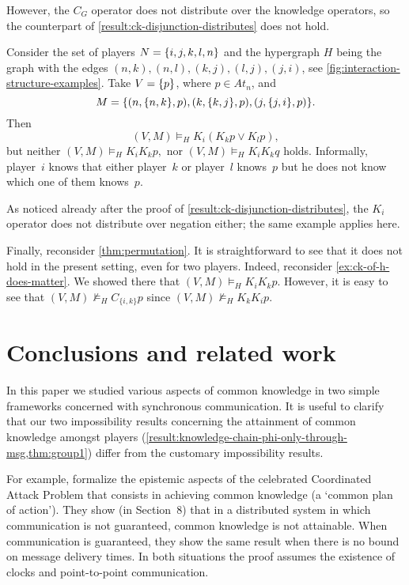 \documentclass{article}
\newcounter{#1}
\newcommand{\state}[1][]{\ensuremath{(V#1,M#1)}\xspace}
\newcommand{\bits}{\ensuremath{At}\xspace}
\newcommand{\knows}[1]{\ensuremath{K_{#1}}\xspace}
\newcommand{\ck}[1]{\ensuremath{C_{#1}}\xspace}\newcommand{\Facts}{\mathit{Facts}}
\renewcommand{\enspace}{}
\begin{document}
However, the $\ck G$ operator does not distribute over the knowledge operators,
so the counterpart of \cref{result:ck-disjunction-distributes} does not hold.

\begin{example}
  \label{ex:ck-doesnt-distribute-over-k}
  Consider the set of players $N = \mbox{$\{{i,j,k,l,n}\}$}$
  and the hypergraph $H$ being the graph with the edges
  $(n,k), (n,l), (k,j), (l,j), (j,i)$,
  see \cref{fig:interaction-structure-examples}.
  Take $V = \mbox{$\{{p}\}$}$, where $p \in \bits_n$, and
  \[
  M =
  \C{(n,\C{n,k},p), (k,\C{k,j},p), (j,\C{j,i},p)}\enspace.
  \]
  Then
  \[
  \state \vDash_H \knows i(\knows k p \vee \knows l p),
  \]
  but neither
  $
  \state \vDash_H \knows i \knows k p,
  $
  nor
  $
  \state \vDash_H \knows i \knows k q
  $
  holds. Informally, player~$i$ knows that either player~$k$ or player~$l$ knows~$p$
  but he does not know which one of them knows~$p$.
\end{example}

As noticed already after the proof of \cref{result:ck-disjunction-distributes},
the $\knows i$ operator does not distribute over negation either;
the same example applies here.

Finally, reconsider \cref{thm:permutation}. It is straightforward to see that it does not hold in 
the present setting, even for two players. Indeed, reconsider \cref{ex:ck-of-h-does-matter}.
We showed there that $\state \vDash_H \knows i \knows k p$. However, it is easy to see that 
$\state \nvDash_H \ck{\{i, k\}} p$ since $\state \nvDash_H \knows k \knows i p$. 

\section{Conclusions and related work}
\label{sec:conclusions}

In this paper we studied various aspects of common knowledge in two
simple frameworks concerned with synchronous communication. It is
useful to clarify that our two impossibility results concerning
the attainment of common knowledge amongst players
(\cref{result:knowledge-chain-phi-only-through-msg,thm:group1})
differ from the customary impossibility results.

For example, \citet{HM90} formalize the epistemic aspects of the
celebrated Coordinated Attack Problem that consists in
achieving common knowledge (a `common plan of action').
They show (in Section~8) that in a
distributed system in which communication is not guaranteed, common
knowledge is not attainable. When communication is guaranteed, they
show the same result when there is no bound on message delivery
times. In both situations the proof assumes the existence of clocks and
point-to-point communication.
\end{document}
